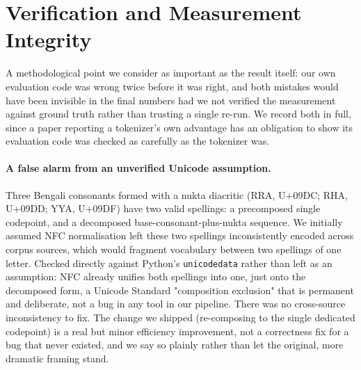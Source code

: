 \documentclass[11pt]{article}
\begin{document}
\section{Verification and Measurement Integrity}
A methodological point we consider as important as the result itself: our own
evaluation code was wrong twice before it was right, and both mistakes would
have been invisible in the final numbers had we not verified the measurement
against ground truth rather than trusting a single re-run. We record both
in full, since a paper reporting a tokenizer's own advantage has an obligation
to show its evaluation code was checked as carefully as the tokenizer was.

\paragraph{A false alarm from an unverified Unicode assumption.} Three Bengali
consonants formed with a nukta diacritic (RRA, U+09DC; RHA, U+09DD; YYA,
U+09DF) have two valid spellings: a precomposed single codepoint, and a
decomposed base-consonant-plus-nukta sequence. We initially assumed NFC
normalisation left these two spellings inconsistently encoded across corpus
sources, which would fragment vocabulary between two spellings of one letter.
Checked directly against Python's \texttt{unicodedata} rather than left as an
assumption: NFC already unifies both spellings into one, just onto the
decomposed form, a Unicode Standard "composition exclusion" that is permanent
and deliberate, not a bug in any tool in our pipeline. There was no
cross-source inconsistency to fix. The change we shipped (re-composing to the
single dedicated codepoint) is a real but minor efficiency improvement, not a
correctness fix for a bug that never existed, and we say so plainly rather
than let the original, more dramatic framing stand.
\end{document}
